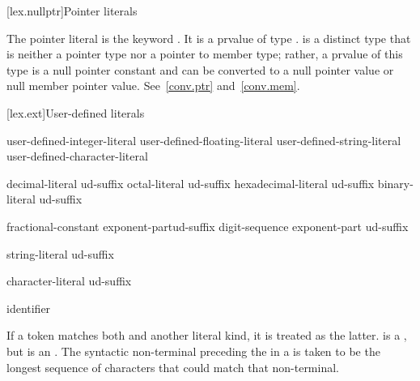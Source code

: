 [lex.nullptr]{Pointer literals}

%
\begin{bnf}
\br
\end{bnf}

\pnum
The pointer literal is the keyword . It is a prvalue of type
.
\enternote
{} is a distinct type that is neither a pointer type nor a pointer
to member type; rather, a prvalue of this type is a null pointer constant and can be
converted to a null pointer value or null member pointer value. See~\ref{conv.ptr}
and~\ref{conv.mem}.
\exitnote

[lex.ext]{User-defined literals}

%
\begin{bnf}
\br
    user-defined-integer-literal\br
    user-defined-floating-literal\br
    user-defined-string-literal\br
    user-defined-character-literal
\end{bnf}

\begin{bnf}
\br
    decimal-literal ud-suffix\br
    octal-literal ud-suffix\br
    hexadecimal-literal ud-suffix\br
    binary-literal ud-suffix
\end{bnf}

\begin{bnf}
\br
    fractional-constant exponent-part\opt ud-suffix\br
    digit-sequence exponent-part ud-suffix
\end{bnf}

\begin{bnf}
\br
    string-literal ud-suffix
\end{bnf}

\begin{bnf}
\br
    character-literal ud-suffix
\end{bnf}

\begin{bnf}
\br
    identifier
\end{bnf}

\pnum
If a token matches both  and another literal kind, it
is treated as the latter. \enterexample {}
is a , but  is an
. \exitexample
The syntactic non-terminal preceding the  in a
 is taken to be the longest sequence of
characters that could match that non-terminal.

